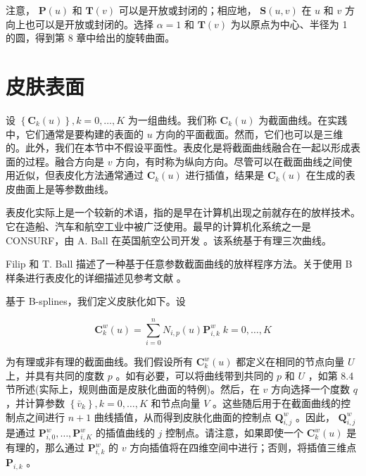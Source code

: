 \documentclass[../main.tex]{subfiles}
\begin{document}
注意， \(\mathbf{P}\left( u\right)\) 和 \(\mathbf{T}\left( v\right)\) 可以是开放或封闭的；相应地， \(\mathbf{S}\left( {u,v}\right)\) 在 \(u\) 和 \(v\) 方向上也可以是开放或封闭的。选择 \(\alpha  = 1\) 和 \(\mathbf{T}\left( v\right)\) 为以原点为中心、半径为 1 的圆，得到第 8 章中给出的旋转曲面。


\section{皮肤表面}
设 \(\left\{  {{\mathbf{C}}_{k}\left( u\right) }\right\}  ,k = 0,\ldots ,K\) 为一组曲线。我们称 \({\mathbf{C}}_{k}\left( u\right)\) 为截面曲线。在实践中，它们通常是要构建的表面的 \(u\) 方向的平面截面。然而，它们也可以是三维的。此外，我们在本节中不假设平面性。表皮化是将截面曲线融合在一起以形成表面的过程。融合方向是 \(v\) 方向，有时称为纵向方向。尽管可以在截面曲线之间使用近似，但表皮化方法通常通过 \({\mathbf{C}}_{k}\left( u\right)\) 进行插值，结果是 \({\mathbf{C}}_{k}\left( u\right)\) 在生成的表皮曲面上是等参数曲线。

表皮化实际上是一个较新的术语，指的是早在计算机出现之前就存在的放样技术。它在造船、汽车和航空工业中被广泛使用。最早的计算机化系统之一是 CONSURF，由 A. Ball 在英国航空公司开发 \cite{Ball74,Ball75,Ball77}。该系统基于有理三次曲线。



Filip 和 T. Ball \cite{Fili89} 描述了一种基于任意参数截面曲线的放样程序方法。关于使用 B 样条进行表皮化的详细描述见参考文献 \cite{Till83,Wood87,Wood88,Hohm91}。

基于 B-splines，我们定义皮肤化如下。设

\[
{\mathbf{C}}_{k}^{w}\left( u\right)  = \mathop{\sum }\limits_{{i = 0}}^{n}{N}_{i,p}\left( u\right) {\mathbf{P}}_{i,k}^{w}\;k = 0,\ldots ,K \tag{10.7}
\]

为有理或非有理的截面曲线。我们假设所有 \({\mathbf{C}}_{k}^{w}\left( u\right)\) 都定义在相同的节点向量 \(U\) 上，并具有共同的度数 \(p\) 。如有必要，可以将曲线带到共同的 \(p\) 和 \(U\) ，如第 8.4 节所述(实际上，规则曲面是皮肤化曲面的特例)。然后，在 \(v\) 方向选择一个度数 \(q\) ，并计算参数 \(\left\{  {\bar{v}}_{k}\right\}  ,k = 0,\ldots ,K\) 和节点向量 \(V\) 。这些随后用于在截面曲线的控制点之间进行 \(n + 1\) 曲线插值，从而得到皮肤化曲面的控制点 \({\mathbf{Q}}_{i,j}^{w}\) 。因此， \({\mathbf{Q}}_{i,j}^{w}\) 是通过 \({\mathbf{P}}_{i,0}^{w},\ldots ,{\mathbf{P}}_{i,K}^{w}\) 的插值曲线的 \(j\) 控制点。请注意，如果即使一个 \({\mathbf{C}}_{k}^{w}\left( u\right)\) 是有理的，那么通过 \({\mathbf{P}}_{i,k}^{w}\) 的 \(v\) 方向插值将在四维空间中进行；否则，将插值三维点 \({\mathbf{P}}_{i,k}\) 。
\end{document}
